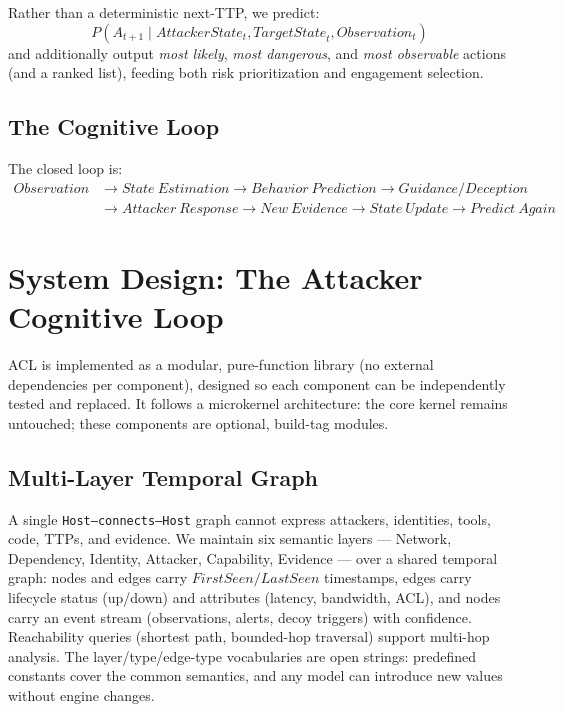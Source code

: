 \documentclass[11pt]{article}
\newcommand{\act}[1]{\texttt{#1}}
\begin{document}
Rather than a deterministic next-TTP, we predict:
\[
P(A_{t+1} \mid \mathit{AttackerState}_t, \mathit{TargetState}_t,
\mathit{Observation}_t)
\]
and additionally output \textit{most likely}, \textit{most dangerous}, and
\textit{most observable} actions (and a ranked list), feeding both risk
prioritization and engagement selection.

\subsection{The Cognitive Loop}
\label{sec:loop}

The closed loop is:
\[
\begin{aligned}
\mathit{Observation} &\to \mathit{State\ Estimation}
\to \mathit{Behavior\ Prediction}
\to \mathit{Guidance/Deception} \\
&\to \mathit{Attacker\ Response}
\to \mathit{New\ Evidence}
\to \mathit{State\ Update}
\to \mathit{Predict\ Again}
\end{aligned}
\]

\section{System Design: The Attacker Cognitive Loop}
\label{sec:design}

ACL is implemented as a modular, pure-function library (no external
dependencies per component), designed so each component can be independently
tested and replaced. It follows a microkernel architecture: the core kernel
remains untouched; these components are optional, build-tag modules.

\subsection{Multi-Layer Temporal Graph}
\label{sec:graph}

A single \act{Host--connects--Host} graph cannot express attackers,
identities, tools, code, TTPs, and evidence. We maintain six semantic layers
--- Network, Dependency, Identity, Attacker, Capability, Evidence --- over a
shared temporal graph: nodes and edges carry
$\mathit{FirstSeen}/\mathit{LastSeen}$ timestamps, edges carry lifecycle
status (up/down) and attributes (latency, bandwidth, ACL), and nodes carry an
event stream (observations, alerts, decoy triggers) with confidence.
Reachability queries (shortest path, bounded-hop traversal) support
multi-hop analysis. The layer/type/edge-type vocabularies are open strings:
predefined constants cover the common semantics, and any model can introduce
new values without engine changes.
\end{document}
